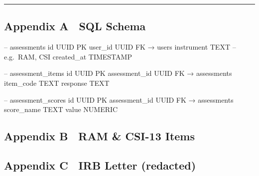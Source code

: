 \documentclass[
]{article}
\begin{document}
\begin{center}\rule{0.5\linewidth}{0.5pt}\end{center}

\subsection{Appendix A SQL Schema}\label{appendix-a-sql-schema}

-- assessments id UUID PK user\_id UUID FK → users instrument TEXT --
e.g.~RAM, CSI created\_at TIMESTAMP

-- assessment\_items id UUID PK assessment\_id UUID FK → assessments
item\_code TEXT response TEXT

-- assessment\_scores id UUID PK assessment\_id UUID FK → assessments
score\_name TEXT value NUMERIC

\subsection{Appendix B RAM \& CSI-13
Items}\label{appendix-b-ram-csi-13-items}


\subsection{Appendix C IRB Letter
(redacted)}\label{appendix-c-irb-letter-redacted}
\end{document}
